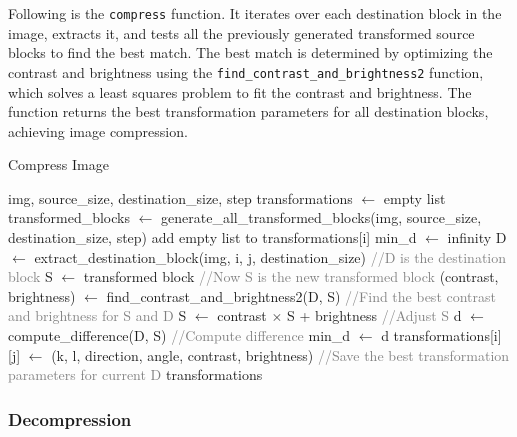 \documentclass{article}
\begin{document}
Following is the \texttt{compress} function. It iterates over each destination block in the image, extracts it, and tests all the previously generated transformed source blocks to find the best match. The best match is determined by optimizing the contrast and brightness using the \texttt{find\_contrast\_and\_brightness2} function, which solves a least squares problem to fit the contrast and brightness. The function returns the best transformation parameters for all destination blocks, achieving image compression.

\begin{algorithm}
\caption{Compress Image}
\begin{algorithmic}[1]
\REQUIRE img, source\_size, destination\_size, step
\STATE transformations $\gets$ empty list
\STATE transformed\_blocks $\gets$ generate\_all\_transformed\_blocks(img, source\_size, destination\_size, step)
    \STATE add empty list to transformations[i]
    \STATE min\_d $\gets$ infinity
    \STATE D $\gets$ extract\_destination\_block(img, i, j, destination\_size) \textcolor{gray}{//D is the destination block}
        \STATE S $\gets$ transformed block \textcolor{gray}{//Now S is the new transformed block}
        \STATE (contrast, brightness) $\gets$ find\_contrast\_and\_brightness2(D, S) \textcolor{gray}{//Find the best contrast and brightness for S and D}
        \STATE S $\gets$ contrast $\times$ S + brightness \textcolor{gray}{//Adjust S}
        \STATE d $\gets$ compute\_difference(D, S) \textcolor{gray}{//Compute difference}
            \STATE min\_d $\gets$ d
            \STATE transformations[i][j] $\gets$ (k, l, direction, angle, contrast, brightness) \textcolor{gray}{//Save the best transformation parameters for current D}
        \ENDIF
    \ENDFOR
\ENDFOR
\RETURN transformations
\end{algorithmic}
\end{algorithm}

\FloatBarrier
\subsubsection{Decompression}
\end{document}
